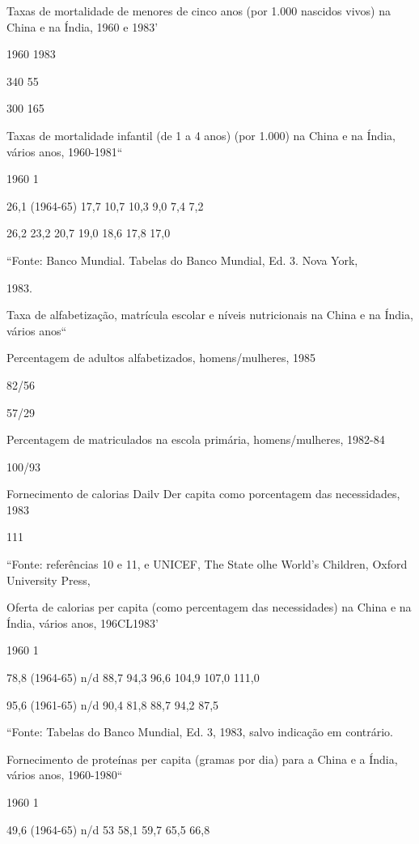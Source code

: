 \documentclass[twocolumn,amsmath,amssymb,aps,pre,floatfix]{revtex4-2}
\begin{document}
\par
Taxas de mortalidade de menores de cinco anos (por 1.000 nascidos vivos) na China e na Índia, 1960 e 1983'
\par
1960 1983
\par
340 55
\par
300 165
\par
Taxas de mortalidade infantil (de 1 a 4 anos) (por 1.000) na China e na Índia, vários anos, 1960-1981“
\par
1960 1%
\par
26,1 (1964-65) 17,7 10,7 10,3 9,0 7,4 7,2
\par
26,2 23,2 20,7 19,0 18,6 17,8 17,0
\par
“Fonte: Banco Mundial. Tabelas do Banco Mundial, Ed. 3. Nova York,
\par
1983.
\par
Taxa de alfabetização, matrícula escolar e níveis nutricionais na China e na Índia, vários anos“
\par
Percentagem de adultos alfabetizados, homens/mulheres, 1985
\par
82/56
\par
57/29
\par
Percentagem de matriculados na escola primária, homens/mulheres, 1982-84
\par
100/93
\par
Fornecimento de calorias Dailv Der capita como porcentagem das necessidades, 1983
\par
111
\par
“Fonte: referências 10 e 11, e UNICEF, The State olhe World’s Children, Oxford University Press,
\par
Oferta de calorias per capita (como percentagem das necessidades) na China e na Índia, vários anos, 196CL1983'
\par
1960 1%
\par
78,8 (1964-65) n/d 88,7 94,3 96,6 104,9 107,0 111,0
\par
95,6 (1961-65) n/d 90,4 81,8 88,7 94,2 87,5%
\par
“Fonte: Tabelas do Banco Mundial, Ed. 3, 1983, salvo indicação em contrário.
\par
Fornecimento de proteínas per capita (gramas por dia) para a China e a Índia, vários anos, 1960-1980“
\par
1960 1%
\par
49,6 (1964-65) n/d 53 58,1 59,7 65,5 66,8
\par
\end{document}
